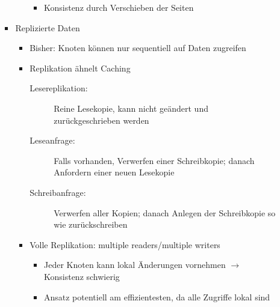 \begin{itemize}
\begin{itemize}
\begin{itemize}
\begin{itemize}
\begin{itemize}
					\item Konsistenz durch Verschieben der Seiten
				\end{itemize}
			\end{itemize}
			\item Replizierte Daten
			\begin{itemize}
				\item Bisher: Knoten können nur sequentiell auf Daten zugreifen
				\item Replikation ähnelt Caching
				\begin{description}
					\item[Lesereplikation:] Reine Lesekopie, kann nicht geändert und zurückgeschrieben werden
					\item[Leseanfrage:] Falls vorhanden, Verwerfen einer Schreibkopie; danach Anfordern einer neuen Lesekopie
					\item[Schreibanfrage:] Verwerfen aller Kopien; danach Anlegen der Schreibkopie so wie zurückschreiben
				\end{description}
				\item Volle Replikation: multiple readers/multiple writers
				\begin{itemize}
					\item Jeder Knoten kann lokal Änderungen vornehmen \(\rightarrow\) Konsistenz schwierig
					\item Ansatz potentiell am effizientesten, da alle Zugriffe lokal sind
				\end{itemize}
			\end{itemize}
		\end{itemize}
	\end{itemize}
\end{itemize}

